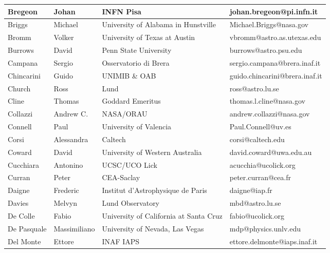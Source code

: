 \begin{center}
\begin{longtable}{|p{1.6cm} |p{1.6cm} |p{2cm} |p{3cm} |}
\tiny Bregeon &\tiny Johan & \tiny INFN Pisa & \tiny johan.bregeon@pi.infn.it \\ \hline
\tiny Briggs &\tiny Michael & \tiny University of Alabama in Hunstville & \tiny Michael.Briggs@nasa.gov \\ \hline
\tiny Bromm &\tiny Volker & \tiny University of Texas at Austin & \tiny vbromm@astro.as.utexas.edu \\ \hline
\tiny Burrows &\tiny David & \tiny Penn State University & \tiny burrows@astro.psu.edu \\ \hline
\tiny Campana &\tiny Sergio & \tiny Osservatorio di Brera & \tiny sergio.campana@brera.inaf.it \\ \hline
\tiny Chincarini &\tiny Guido & \tiny UNIMIB \& OAB & \tiny guido.chincarini@brera.inaf.it \\ \hline
\tiny Church &\tiny Ross & \tiny Lund & \tiny ross@astro.lu.se \\ \hline
\tiny Cline &\tiny Thomas & \tiny Goddard Emeritus & \tiny thomas.l.cline@nasa.gov \\ \hline
\tiny Collazzi &\tiny Andrew C. & \tiny NASA/ORAU & \tiny andrew.collazzi@nasa.gov \\ \hline
\tiny Connell &\tiny Paul & \tiny University of Valencia & \tiny Paul.Connell@uv.es \\ \hline
\tiny Corsi &\tiny Alessandra & \tiny Caltech & \tiny corsi@caltech.edu \\ \hline
\tiny Coward &\tiny David & \tiny University of Western Australia & \tiny david.coward@uwa.edu.au \\ \hline
\tiny Cucchiara &\tiny Antonino & \tiny UCSC/UCO Lick & \tiny acucchia@ucolick.org \\ \hline
\tiny Curran &\tiny Peter & \tiny CEA-Saclay & \tiny peter.curran@cea.fr \\ \hline
\tiny Daigne &\tiny Frederic & \tiny Institut d'Astrophysique de Paris & \tiny daigne@iap.fr \\ \hline
\tiny Davies &\tiny Melvyn & \tiny Lund Observatory & \tiny mbd@astro.lu.se \\ \hline
\tiny De Colle &\tiny Fabio & \tiny University of California at Santa Cruz & \tiny fabio@ucolick.org \\ \hline
\tiny De Pasquale &\tiny Massimiliano & \tiny University of Nevada, Las Vegas & \tiny mdp@physics.unlv.edu \\ \hline
\tiny Del Monte &\tiny Ettore & \tiny INAF IAPS & \tiny ettore.delmonte@iaps.inaf.it \\ \hline

\end{longtable}
\end{center}
